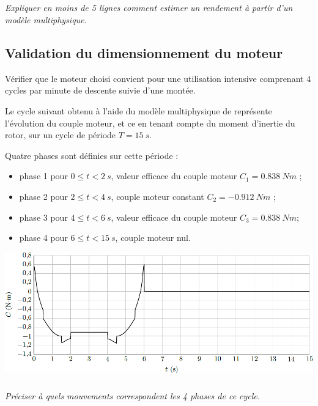 \documentclass[10pt,fleqn]{article} %
\begin{document}
\begin{multicols}{2}
\subparagraph{} \textit{Expliquer en moins de 5 lignes comment estimer un rendement à partir d'un modèle multiphysique.}
\ifprof
\begin{corrige}
\end{corrige}
\else
\fi

\subsection*{Validation du dimensionnement du moteur}
\begin{obj}
Vérifier que le moteur choisi convient pour une utilisation intensive comprenant 4 cycles par minute
de descente suivie d’une montée.
\end{obj}

Le cycle suivant obtenu à l’aide du modèle multiphysique de représente l’évolution du couple moteur,
et ce en tenant compte du moment d’inertie du rotor, sur un cycle de période $T=\SI{15}{s}$.


\noindent Quatre phases sont définies sur cette période :
\begin{itemize}
\item phase 1 pour $0 \leq t < \SI{2}{s}$, valeur efficace du couple moteur $C_1 = \SI{0,838}{Nm}$ ;
\item phase 2 pour $2 \leq t < \SI{4}{s}$, couple moteur constant $C_2 = -\SI{0,912}{Nm}$ ;
\item phase 3 pour $4 \leq t < \SI{6}{s}$, valeur efficace du couple moteur $C_3 = \SI{0,838}{Nm}$;
\item phase 4 pour $6 \leq t < \SI{15}{s}$, couple moteur nul.
\end{itemize}



\begin{center}
\includegraphics[width=\linewidth]{images/fig_12}
\end{center}


\subparagraph{} \textit{Préciser à quels mouvements correspondent les 4 phases de ce cycle.}


\end{multicols}
\end{document}

